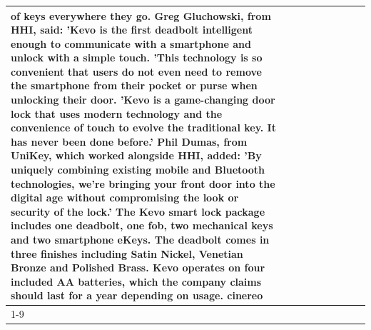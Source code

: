 \begin{table}[H]
\begin{tabular}{lllrlllll}
of keys everywhere they go. Greg Gluchowski, from HHI, said: 'Kevo is the first deadbolt intelligent enough to communicate with a smartphone and unlock with a simple touch. 'This technology is so convenient that users do not even need to remove the smartphone from their pocket or purse when unlocking their door. 'Kevo is a game-changing door lock that uses modern technology and the convenience of touch to evolve the traditional key. It has never been done before.' Phil Dumas, from UniKey, which worked alongside HHI, added: 'By uniquely combining existing mobile and Bluetooth technologies, we’re bringing your front door into the digital age without compromising the look or security of the lock.' The Kevo smart lock package includes one deadbolt, one fob, two mechanical keys and two smartphone eKeys. The deadbolt comes in three finishes including Satin Nickel, Venetian Bronze and Polished Brass. Kevo operates on four included AA batteries, which the company claims should last for a year depending on usage. cinereo \\
\cline{1-9}

\end{tabular}
\end{table}
